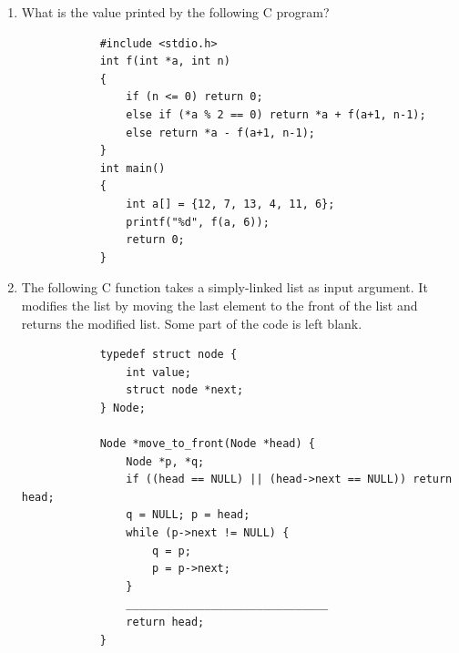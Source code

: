\documentclass[journal,12pt,onecolumn]{IEEEtran}
\theoremstyle{remark}
\begin{document}
\begin{enumerate}
		\hfill{}
		
		\begin{enumerate}
		\end{enumerate}
		
		\item What is the value printed by the following C program?
		\begin{verbatim}
			#include <stdio.h>
			int f(int *a, int n)
			{
				if (n <= 0) return 0;
				else if (*a % 2 == 0) return *a + f(a+1, n-1);
				else return *a - f(a+1, n-1);
			}
			int main()
			{
				int a[] = {12, 7, 13, 4, 11, 6};
				printf("%d", f(a, 6));
				return 0;
			}
		\end{verbatim}
		
		\hfill{\brak{\text{GATE CS 2010}}}
		
		\begin{enumerate}
			\begin{multicols}{4}
				\item $-9$
				\item $5$
				\item $15$
				\item $19$
			\end{multicols}
		\end{enumerate}
		
		\item The following C function takes a simply-linked list as input argument. It modifies the list by moving the last element to the front of the list and returns the modified list. Some part of the code is left blank.
		
		\begin{verbatim}
			typedef struct node {
				int value;
				struct node *next;
			} Node;
			
			Node *move_to_front(Node *head) {
				Node *p, *q;
				if ((head == NULL) || (head->next == NULL)) return head;
				q = NULL; p = head;
				while (p->next != NULL) {
					q = p;
					p = p->next;
				}
				_______________________________
				return head;
			}
		\end{verbatim}
		

\end{enumerate}
\end{document}
